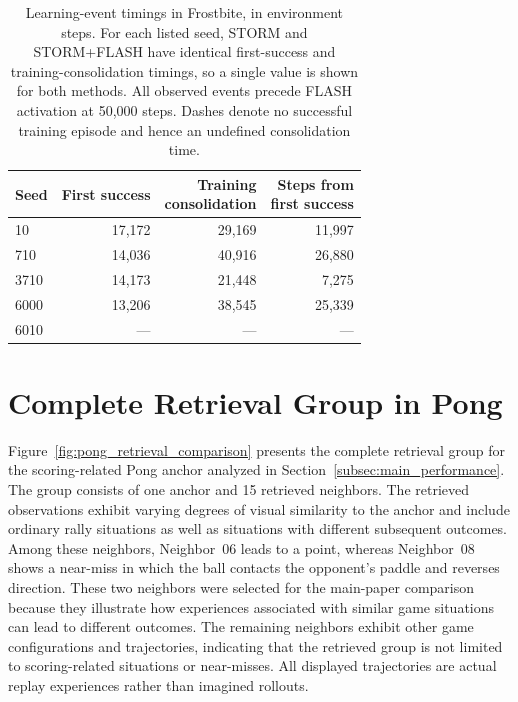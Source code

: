 \documentclass{article} %
\begin{document}
\begin{table}[!htbp]
\centering
\caption{Learning-event timings in Frostbite, in environment steps. For each listed seed, STORM and STORM+FLASH have identical first-success and training-consolidation timings, so a single value is shown for both methods. All observed events precede FLASH activation at 50,000 steps. Dashes denote no successful training episode and hence an undefined consolidation time.}
\label{tab:exploitation_timing}
\small
\setlength{\tabcolsep}{4pt}
\renewcommand{\arraystretch}{1.12}
\begin{tabular*}{\textwidth}{@{\extracolsep{\fill}}lrrr@{}}
\toprule
Seed & First success & \shortstack{Training\\consolidation} & \shortstack{Steps from\\first success} \\
\midrule
10   & 17,172 & 29,169 & 11,997 \\
710  & 14,036 & 40,916 & 26,880 \\
3710 & 14,173 & 21,448 & 7,275 \\
6000 & 13,206 & 38,545 & 25,339 \\
6010 & --- & --- & --- \\
\bottomrule
\end{tabular*}
\end{table}


\FloatBarrier

\onecolumn
\section{Complete Retrieval Group in Pong}
\label{app:pong_retrieval}

Figure~\ref{fig:pong_retrieval_comparison} presents the complete retrieval group for the scoring-related Pong anchor analyzed in Section~\ref{subsec:main_performance}. The group consists of one anchor and 15 retrieved neighbors. The retrieved observations exhibit varying degrees of visual similarity to the anchor and include ordinary rally situations as well as situations with different subsequent outcomes. Among these neighbors, Neighbor~06 leads to a point, whereas Neighbor~08 shows a near-miss in which the ball contacts the opponent's paddle and reverses direction. These two neighbors were selected for the main-paper comparison because they illustrate how experiences associated with similar game situations can lead to different outcomes. The remaining neighbors exhibit other game configurations and trajectories, indicating that the retrieved group is not limited to scoring-related situations or near-misses. All displayed trajectories are actual replay experiences rather than imagined rollouts.
\end{document}
